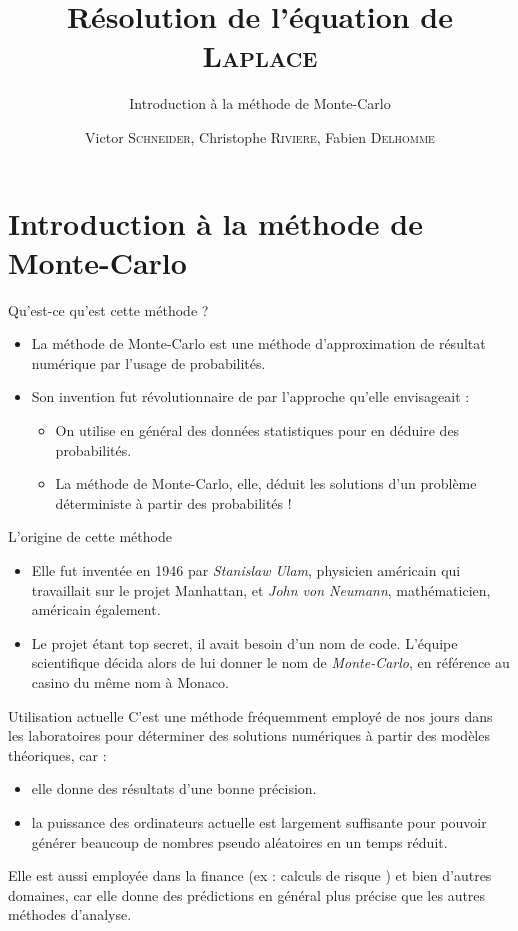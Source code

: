 \documentclass{beamer}
\title[Introduction à la méthode de Monte-Carlo]{Résolution de l'équation de \textsc{Laplace}}
\subtitle{Introduction à la méthode de Monte-Carlo}
\author{Victor \textsc{Schneider}, Christophe \textsc{Riviere}, Fabien \textsc{Delhomme}}
\institute{UFR de mathématiques de Strasbourg}
\begin{document}
\begin{frame}
    \titlepage
\end{frame}

\section{Introduction à la méthode de Monte-Carlo}

\begin{frame}{Qu'est-ce qu'est cette méthode ?}
    \begin{itemize}
        \item La méthode de Monte-Carlo est une méthode d'approximation de
            résultat numérique par l'usage de probabilités.
        \item Son invention fut révolutionnaire de par l'approche qu'elle envisageait :
            \begin{itemize}
                \item On utilise en général des données statistiques pour en
                    déduire des probabilités.
                \item La méthode de Monte-Carlo, elle, déduit les solutions d'un
                    problème déterministe à partir des probabilités !
            \end{itemize}
    \end{itemize}
\end{frame}


\begin{frame}{L'origine de cette méthode}
    \begin{itemize}
        \item Elle fut inventée en 1946 par \emph{Stanislaw Ulam}, physicien
            américain qui travaillait sur le projet Manhattan, et  \emph{John
            von Neumann}, mathématicien, américain également.
        \pause
        \medbreak
        \item Le projet étant top secret, il avait besoin d'un nom de code.
            L'équipe scientifique décida alors de lui donner le nom de
            \emph{Monte-Carlo}, en référence au casino du même nom à Monaco.
    \end{itemize}
\end{frame}


\begin{frame}{Utilisation actuelle}
    C'est une méthode fréquemment employé de nos jours dans les laboratoires
    pour déterminer des solutions numériques à partir des modèles théoriques,
    car :
    \begin{itemize}
        \item elle donne des résultats d'une bonne précision.
        \item la puissance des ordinateurs actuelle est largement suffisante
            pour pouvoir générer beaucoup de nombres pseudo aléatoires en un
            temps réduit.
    \end{itemize}
    Elle est aussi employée dans la finance (ex : calculs de risque ) et bien
    d'autres domaines, car elle donne des prédictions en général plus précise
    que les autres méthodes d'analyse.
\end{frame}
\end{document}

